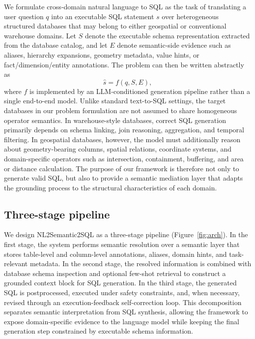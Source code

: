 \documentclass[11pt]{article}
\begin{document}
We formulate cross-domain natural language to SQL as the task of translating a user question $q$ into an executable SQL statement $s$ over heterogeneous structured databases that may belong to either geospatial or conventional warehouse domains. Let $S$ denote the executable schema representation extracted from the database catalog, and let $E$ denote semantic-side evidence such as aliases, hierarchy expansions, geometry metadata, value hints, or fact/dimension/entity annotations. The problem can then be written abstractly as
\begin{equation}
  \hat{s} = f(q, S, E),
\end{equation}
where $f$ is implemented by an LLM-conditioned generation pipeline rather than a single end-to-end model. Unlike standard text-to-SQL settings, the target databases in our problem formulation are not assumed to share homogeneous operator semantics. In warehouse-style databases, correct SQL generation primarily depends on schema linking, join reasoning, aggregation, and temporal filtering. In geospatial databases, however, the model must additionally reason about geometry-bearing columns, spatial relations, coordinate systems, and domain-specific operators such as intersection, containment, buffering, and area or distance calculation. The purpose of our framework is therefore not only to generate valid SQL, but also to provide a semantic mediation layer that adapts the grounding process to the structural characteristics of each domain.

\subsection{Three-stage pipeline}

We design NL2Semantic2SQL as a three-stage pipeline (Figure~\ref{fig:arch}). In the first stage, the system performs semantic resolution over a semantic layer that stores table-level and column-level annotations, aliases, domain hints, and task-relevant metadata. In the second stage, the resolved information is combined with database schema inspection and optional few-shot retrieval to construct a grounded context block for SQL generation. In the third stage, the generated SQL is postprocessed, executed under safety constraints, and, when necessary, revised through an execution-feedback self-correction loop. This decomposition separates semantic interpretation from SQL synthesis, allowing the framework to expose domain-specific evidence to the language model while keeping the final generation step constrained by executable schema information.
\end{document}
